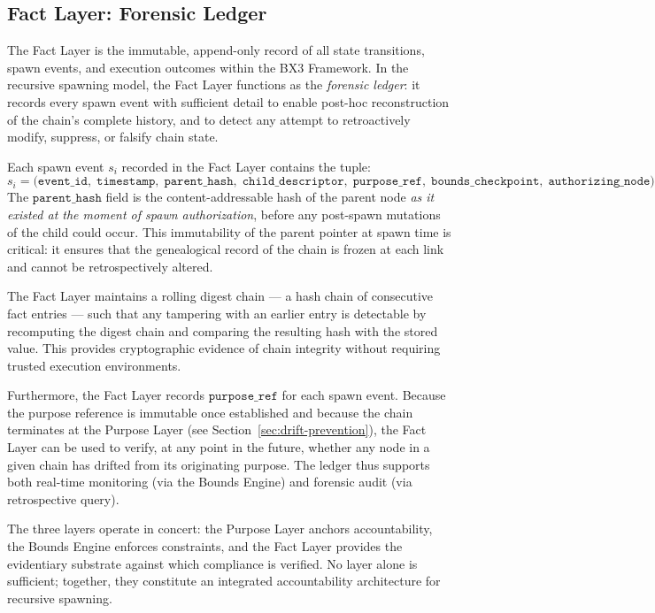 \subsection{Fact Layer: Forensic Ledger}
\label{sec:fact-layer}

The Fact Layer is the immutable, append-only record of all state transitions, spawn events, and execution outcomes within the BX3 Framework. In the recursive spawning model, the Fact Layer functions as the \emph{forensic ledger}: it records every spawn event with sufficient detail to enable post-hoc reconstruction of the chain's complete history, and to detect any attempt to retroactively modify, suppress, or falsify chain state.

Each spawn event $s_i$ recorded in the Fact Layer contains the tuple:
\[
s_i = \bigl( \texttt{event\_id}, \; \texttt{timestamp}, \; \texttt{parent\_hash}, \; \texttt{child\_descriptor}, \; \texttt{purpose\_ref}, \; \texttt{bounds\_checkpoint}, \; \texttt{authorizing\_node} \bigr)
\]
The $\texttt{parent\_hash}$ field is the content-addressable hash of the parent node \emph{as it existed at the moment of spawn authorization}, before any post-spawn mutations of the child could occur. This immutability of the parent pointer at spawn time is critical: it ensures that the genealogical record of the chain is frozen at each link and cannot be retrospectively altered.

The Fact Layer maintains a rolling digest chain --- a hash chain of consecutive fact entries --- such that any tampering with an earlier entry is detectable by recomputing the digest chain and comparing the resulting hash with the stored value. This provides cryptographic evidence of chain integrity without requiring trusted execution environments.

Furthermore, the Fact Layer records $\texttt{purpose\_ref}$ for each spawn event. Because the purpose reference is immutable once established and because the chain terminates at the Purpose Layer (see Section~\ref{sec:drift-prevention}), the Fact Layer can be used to verify, at any point in the future, whether any node in a given chain has drifted from its originating purpose. The ledger thus supports both real-time monitoring (via the Bounds Engine) and forensic audit (via retrospective query).

The three layers operate in concert: the Purpose Layer anchors accountability, the Bounds Engine enforces constraints, and the Fact Layer provides the evidentiary substrate against which compliance is verified. No layer alone is sufficient; together, they constitute an integrated accountability architecture for recursive spawning.


